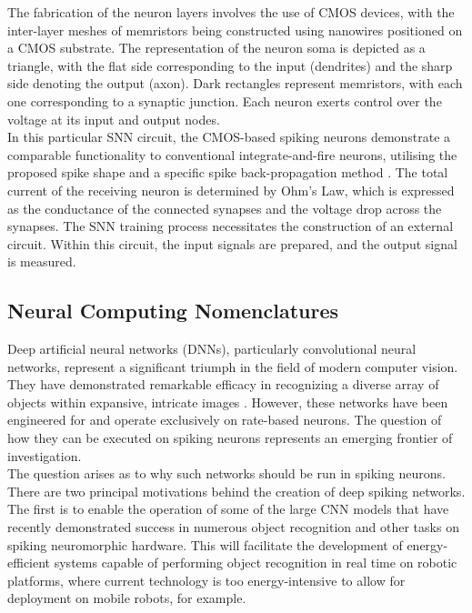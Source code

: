\noindent  The fabrication of the neuron layers involves the use of CMOS devices, with the inter-layer meshes of memristors being constructed using nanowires positioned on a CMOS substrate. The representation of the neuron soma is depicted as a triangle, with the flat side corresponding to the input (dendrites) and the sharp side denoting the output (axon). Dark rectangles represent memristors, with each one corresponding to a synaptic junction. Each neuron exerts control over the voltage at its input and output nodes. \\

\noindent In this particular SNN circuit, the CMOS-based spiking neurons demonstrate a comparable functionality to conventional integrate-and-fire neurons, utilising the proposed spike shape and a specific spike back-propagation method \cite{prezioso2016self}. The total current of the receiving neuron is determined by Ohm's Law, which is expressed as the conductance of the connected synapses and the voltage drop across the synapses. The SNN training process necessitates the construction of an external circuit. Within this circuit, the input signals are prepared, and the output signal is measured.

\subsection[Neural Computing Nomenclatures]{Neural Computing Nomenclatures}

Deep artificial neural networks (DNNs), particularly convolutional neural networks, represent a significant triumph in the field of modern computer vision. They have demonstrated remarkable efficacy in recognizing a diverse array of objects within expansive, intricate images \cite{krizhevsky2012imagenet}. However, these networks have been engineered for and operate exclusively on rate-based neurons. The question of how they can be executed on spiking neurons represents an emerging frontier of investigation.\\

\noindent The question arises as to why such networks should be run in spiking neurons. There are two principal motivations behind the creation of deep spiking networks. The first is to enable the operation of some of the large CNN models that have recently demonstrated success in numerous object recognition and other tasks on spiking neuromorphic hardware. This will facilitate the development of energy-efficient systems capable of performing object recognition in real time on robotic platforms, where current technology is too energy-intensive to allow for deployment on mobile robots, for example. \\

